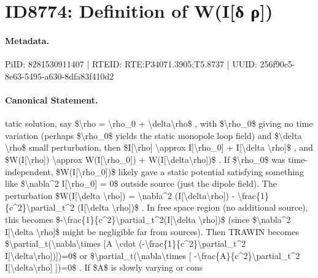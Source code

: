 \section*{ID8774: Definition of W(I[δ ρ])}
\paragraph{Metadata.}
PiID: 8281530911407 | RTEID: RTE:P34071.3905:T5.8737 | UUID: 256f90e5-8e63-5495-a630-8dfa83f410d2

\paragraph{Canonical Statement.}
tatic solution, say \$\textbackslash{}rho = \textbackslash{}rho\_0 + \textbackslash{}delta\textbackslash{}rho\$ , with \$\textbackslash{}rho\_0\$ giving no time variation (perhaps \$\textbackslash{}rho\_0\$ yields the static monopole loop field) and \$\textbackslash{}delta \textbackslash{}rho\$ small perturbation, then \$I[\textbackslash{}rho] \textbackslash{}approx I[\textbackslash{}rho\_0] + I[\textbackslash{}delta \textbackslash{}rho]\$ , and \$W(I[\textbackslash{}rho]) \textbackslash{}approx W(I[\textbackslash{}rho\_0]) + W(I[\textbackslash{}delta\textbackslash{}rho])\$ . If \$\textbackslash{}rho\_0\$ was time-independent, \$W(I[\textbackslash{}rho\_0])\$ likely gave a static potential satisfying something like \$\textbackslash{}nabla\textasciicircum{}2 I[\textbackslash{}rho\_0] = 0\$ outside source (just the dipole field). The perturbation \$W(I[\textbackslash{}delta \textbackslash{}rho]) = \textbackslash{}nabla\textasciicircum{}2 (I[\textbackslash{}delta\textbackslash{}rho]) - \textbackslash{}frac\{1\}\{c\textasciicircum{}2\}\textbackslash{}partial\_t\textasciicircum{}2 (I[\textbackslash{}delta \textbackslash{}rho])\$ . In free space region (no additional source), this becomes \$-\textbackslash{}frac\{1\}\{c\textasciicircum{}2\}\textbackslash{}partial\_t\textasciicircum{}2(I[\textbackslash{}delta \textbackslash{}rho])\$ (since \$\textbackslash{}nabla\textasciicircum{}2 I[\textbackslash{}delta \textbackslash{}rho]\$ might be negligible far from sources). Then TRAWIN becomes \$\textbackslash{}partial\_t(\textbackslash{}nabla\textbackslash{}times [A \textbackslash{}cdot (-\textbackslash{}frac\{1\}\{c\textasciicircum{}2\}\textbackslash{}partial\_t\textasciicircum{}2 I[\textbackslash{}delta\textbackslash{}rho])])=0\$ or \$\textbackslash{}partial\_t(\textbackslash{}nabla\textbackslash{}times [ -\textbackslash{}frac\{A\}\{c\textasciicircum{}2\}\textbackslash{}partial\_t\textasciicircum{}2 I[\textbackslash{}delta\textbackslash{}rho] ])=0\$ . If \$A\$ is slowly varying or cons

